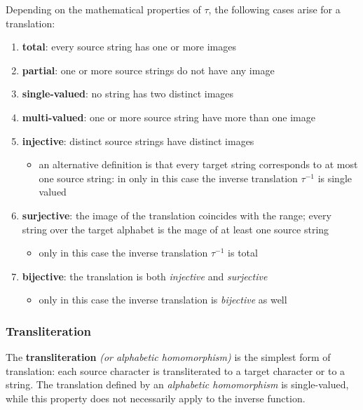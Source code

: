 \documentclass[english]{article}
\begin{document}
\bigskip
Depending on the mathematical properties of \(\tau\), the following cases arise for a translation:

\begin{enumerate}
  \item \textbf{total}: every source string has one or more images
  \item \textbf{partial}: one or more source strings do not have any image
  \item \textbf{single-valued}: no string has two distinct images
  \item \textbf{multi-valued}: one or more source string have more than one image
  \item \textbf{injective}: distinct source strings have distinct images
        \begin{itemize}[label=\(\rightarrow\)]
          \item an alternative definition is that every target string corresponds to at most one source string: in only in this case the inverse translation \(\tau^{-1}\) is single valued
        \end{itemize}
  \item \textbf{surjective}: the image of the translation coincides with the range; every string over the target alphabet is the mage of at least one source string
        \begin{itemize}[label=\(\rightarrow\)]
          \item only in this case the inverse translation \(\tau^{-1}\) is total
        \end{itemize}
  \item \textbf{bijective}: the translation is both \textit{injective} and \textit{surjective}
        \begin{itemize}[label=\(\rightarrow\)]
          \item only in this case the inverse translation is \textit{bijective} as well
        \end{itemize}
\end{enumerate}

\subsubsection{Transliteration}

The \textbf{transliteration} \textit{(or alphabetic homomorphism)} is the simplest form of translation:
each source character is transliterated to a target character or to a string.
The translation defined by an \textit{alphabetic homomorphism} is single-valued, while this property does not necessarily apply to the inverse function.
\end{document}
